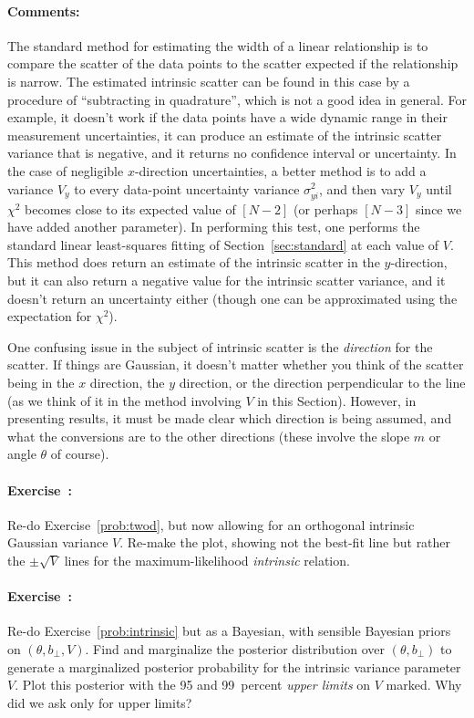 \documentclass[12pt,twoside]{article}
\newcommand{\sectionname}{Section}
\newcommand{\problemname}{Exercise}
\newcommand{\commentsname}{Comments}
\newcounter{problem}
\newenvironment{problem}{\paragraph{\problemname~\theproblem:}\refstepcounter{problem}}{}
\newenvironment{comments}{\paragraph{\commentsname:}}{}
\newcommand{\bperp}{b_{\perp}}
\begin{document}
\begin{comments}
The standard method for estimating the width of a linear relationship
is to compare the scatter of the data points to the scatter expected
if the relationship is narrow.  The estimated intrinsic scatter can be
found in this case by a procedure of ``subtracting in quadrature'',
which is not a good idea in general.  For example, it doesn't work if
the data points have a wide dynamic range in their measurement
uncertainties, it can produce an estimate of the intrinsic scatter
variance that is negative, and it returns no confidence interval or
uncertainty.  In the case of negligible $x$-direction uncertainties, a
better method is to add a variance $V_y$ to every data-point
uncertainty variance $\sigma_{yi}^2$, and then vary $V_y$ until
$\chi^2$ becomes close to its expected value of $[N-2]$ (or perhaps
$[N-3]$ since we have added another parameter).  In performing this
test, one performs the standard linear least-squares fitting of
\sectionname~\ref{sec:standard} at each value of $V$.  This method
does return an estimate of the intrinsic scatter in the $y$-direction,
but it can also return a negative value for the intrinsic scatter
variance, and it doesn't return an uncertainty either (though one can
be approximated using the expectation for $\chi^2$).

One confusing issue in the subject of intrinsic scatter is the
\emph{direction} for the scatter.  If things are Gaussian, it doesn't
matter whether you think of the scatter being in the $x$ direction,
the $y$ direction, or the direction perpendicular to the line (as we
think of it in the method involving $V$ in this \sectionname).
However, in presenting results, it must be made clear which direction
is being assumed, and what the conversions are to the other directions
(these involve the slope $m$ or angle $\theta$ of course).
\end{comments}

\begin{problem}\label{prob:intrinsic}
Re-do \problemname~\ref{prob:twod}, but now allowing for an orthogonal
intrinsic Gaussian variance $V$.  Re-make the plot, showing not the
best-fit line but rather the $\pm\sqrt{V}$ lines for the
maximum-likelihood \emph{intrinsic} relation.
\end{problem}

\begin{problem}
Re-do \problemname~\ref{prob:intrinsic} but as a Bayesian, with
sensible Bayesian priors on $(\theta,\bperp,V)$.  Find and marginalize
the posterior distribution over $(\theta,\bperp)$ to generate a
marginalized posterior probability for the intrinsic variance
parameter $V$.  Plot this posterior with the 95 and 99~percent
\emph{upper limits} on $V$ marked.  Why did we ask only for upper
limits?
\end{problem}
\end{document}

